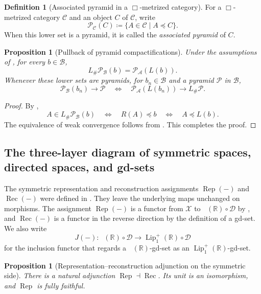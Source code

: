 \documentclass{amsart}
\theoremstyle{plain}
\newtheorem{proposition}[theorem]{Proposition}
\theoremstyle{definition}
\newtheorem*{definition*}{Definition}
\theoremstyle{remark}
\newcommand{\R}{\mathbb{R}}
\newcommand{\D}{\mathcal{D}}
\newcommand{\X}{\mathcal{X}}
\newcommand{\Lup}{\operatorname{Lip}^{+}_{1}(\R)}
\DeclareMathOperator{\lipone}{Lip_1}
\begin{document}
\begin{definition*}[Associated pyramid in a $\Box$-metrized category]
For a $\Box$-metrized category $\mathcal C$ and an object $C$ of $\mathcal C$, write
\[\mathcal P_{\mathcal C}(C)\coloneqq\{A\in\mathcal C\mid A\preceq C\}.\]
When this lower set is a pyramid, it is called the \emph{associated pyramid} of $C$.
\end{definition*}

\begin{proposition}[Pullback of pyramid compactifications]
\label{prop:pyramidal-compactification-pullback}
Under the assumptions of , for every $b\in\mathcal B$,
\[L_{\#}\mathcal P_{\mathcal B}(b)=\mathcal P_{\mathcal A}(L(b)).\]
Whenever these lower sets are pyramids, for $b_n\in\mathcal B$ and a pyramid $\mathcal P$ in $\mathcal B$,
\[
\mathcal P_{\mathcal B}(b_n)\longrightarrow\mathcal P
\quad\Longleftrightarrow\quad
\mathcal P_{\mathcal A}(L(b_n))\longrightarrow L_{\#}\mathcal P.
\]
\end{proposition}

\begin{proof}
By ,
\[
A\in L_{\#}\mathcal P_{\mathcal B}(b)
\quad\Longleftrightarrow\quad R(A)\preceq b
\quad\Longleftrightarrow\quad A\preceq L(b).
\]
The equivalence of weak convergence follows from .
This completes the proof.
\end{proof}

\subsection{The three-layer diagram of symmetric spaces, directed spaces, and gd-sets}
\label{subsec:appendix-three-tier-adjunction}

The symmetric representation and reconstruction assignments $\operatorname{Rep}(-)$ and $\operatorname{Rec}(-)$ were defined in . They leave the underlying maps unchanged on morphisms. The assignment $\operatorname{Rep}(-)$ is a functor from $\X$ to $\lipone(\R)\circ\D$ by , and $\operatorname{Rec}(-)$ is a functor in the reverse direction by the definition of a gd-set. We also write
\[J(-)\colon\lipone(\R)\circ\D\longrightarrow\Lup\circ\D\]
for the inclusion functor that regards a $\lipone(\R)$-gd-set as an $\Lup$-gd-set.

\begin{proposition}[Representation--reconstruction adjunction on the symmetric side]
\label{prop:symmetric-adjunction}
There is a natural adjunction $\operatorname{Rep}\dashv\operatorname{Rec}$. Its unit is an isomorphism, and $\operatorname{Rep}$ is fully faithful.
\end{proposition}
\end{document}
